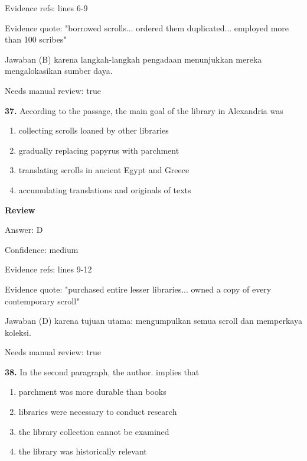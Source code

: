 \documentclass[12pt]{article}
\begin{document}
Evidence refs: lines 6-9\par
Evidence quote: "borrowed scrolls... ordered them duplicated... employed more than 100 scribes"\par
Jawaban (B) karena langkah-langkah pengadaan menunjukkan mereka mengalokasikan sumber daya.\par
Needs manual review: true\par
\endgroup
\par
\vspace{0.25\baselineskip}
\noindent\textbf{37.} According to the passage, the main goal of the library in Alexandria was
\begin{enumerate}[label=(\Alph*),leftmargin=*,itemsep=0.2em]
\item collecting scrolls loaned by other libraries
\item gradually replacing papyrus with parchment
\item translating scrolls in ancient Egypt and Greece
\item accumulating translations and originals of texts
\end{enumerate}
\par
\begingroup
\setlength{\parskip}{0pt}
\setlength{\parindent}{0pt}
\textbf{Review}\par
Answer: D\par
Confidence: medium\par
Evidence refs: lines 9-12\par
Evidence quote: "purchased entire lesser libraries... owned a copy of every contemporary scroll"\par
Jawaban (D) karena tujuan utama: mengumpulkan semua scroll dan memperkaya koleksi.\par
Needs manual review: true\par
\endgroup
\par
\vspace{0.25\baselineskip}
\noindent\textbf{38.} In the second paragraph, the author. implies that
\begin{enumerate}[label=(\Alph*),leftmargin=*,itemsep=0.2em]
\item parchment was more durable than books
\item libraries were necessary to conduct research
\item the library collection cannot be examined
\item the library was historically relevant
\end{enumerate}
\par
\begingroup
\end{document}
